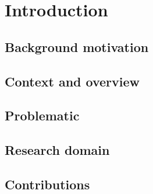 \section{Introduction}

\subsection{Background motivation}

\subsection{Context and overview}

\subsection{Problematic}

\subsection{Research domain}

\subsection{Contributions}